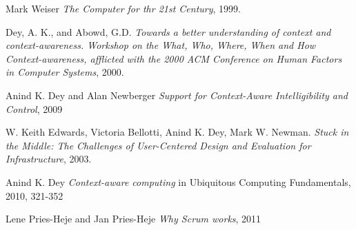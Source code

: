 \documentclass[../report.tex]{subfiles}
\begin{document}
\graphicspath{{img/}{../img/}}
\begin{thebibliography}{9}

  Mark Weiser
  \emph{The Computer for thr 21st Century}, 1999.

  Dey, A. K., and Abowd, G.D.
  \emph{Towards a better understanding of context and context-awareness. Workshop on the What, Who, Where, When and How Context-awareness, afflicted with the 2000 ACM Conference on Human Factors in Computer Systems},
  2000.
  
    Anind K. Dey and Alan Newberger
    \emph{Support for Context-Aware Intelligibility and Control}, 2009
  
  
  W. Keith Edwards, Victoria Bellotti, Anind K. Dey,
  Mark W. Newman.
  \emph{Stuck in the Middle: The Challenges of
  User-Centered Design and Evaluation for Infrastructure},
  2003.
  
    Anind K. Dey
    \emph{Context-aware computing} in Ubiquitous Computing Fundamentals, 2010, 321-352
    
	Lene Pries-Heje and Jan Pries-Heje
	\textit{Why Scrum works}, 2011

\end{thebibliography}
\end{document}
